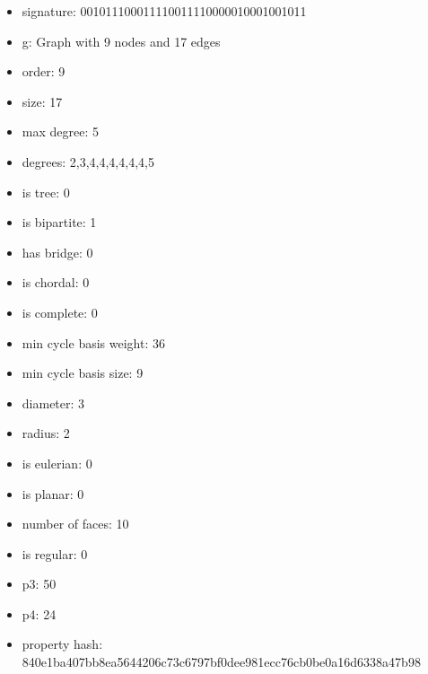 \newpage
\begin{figure}
\end{figure}
\begin{itemize}
\item signature: 001011100011110011110000010001001011
\item g: Graph with 9 nodes and 17 edges
\item order: 9
\item size: 17
\item max degree: 5
\item degrees: 2,3,4,4,4,4,4,4,5
\item is tree: 0
\item is bipartite: 1
\item has bridge: 0
\item is chordal: 0
\item is complete: 0
\item min cycle basis weight: 36
\item min cycle basis size: 9
\item diameter: 3
\item radius: 2
\item is eulerian: 0
\item is planar: 0
\item number of faces: 10
\item is regular: 0
\item p3: 50
\item p4: 24
\item property hash: 840e1ba407bb8ea5644206c73c6797bf0dee981ecc76cb0be0a16d6338a47b98
\end{itemize}
